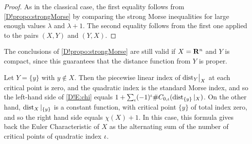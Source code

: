 \begin{proof}
  As in the classical case, the first equality follows from \cref{D!propo:strongMorse} by comparing the strong Morse inequalities for large enough values $\lambda$ and $\lambda +1$. The second equality follows from the first one applied to the pairs $(X,Y)$ and $(Y,X)$.
\end{proof}

\begin{remark}
  The conclusions of \cref{D!propo:strongMorse} are still valid if $X=\mathbf{R}^n$ and $Y$ is compact, since this guarantees that the distance function from $Y$ is proper.
\end{remark}

\begin{example}
  Let $Y=\{y\}$ with $y \notin X$. Then the piecewise linear index of $\mathord{\operatorname{dist}}_Y\big|_X$ at each critical point is zero, and the quadratic index is the standard Morse index, and so the left-hand side of \eqref{D!E:chi} equals $1 + \sum_{\iota} (-1)^\iota \#C_{0,\iota}(\operatorname{dist}_{\{y\}}|_X)$. On the other hand, $\operatorname{dist}_X|_{\{y\}}$ is a constant function, with critical point $\{y\}$ of total index zero, and so the right hand side equals $\chi(X) + 1$. In this case, this formula gives back the Euler Characteristic of $X$ as the alternating sum of the number of critical points of quadratic index $\iota$.
\end{example}

